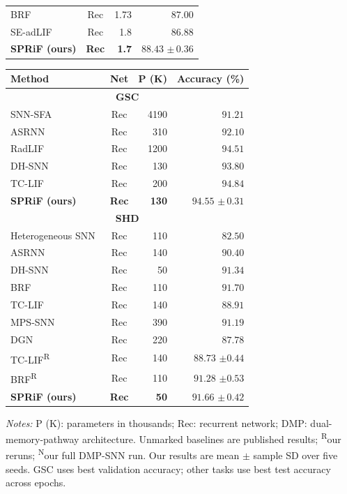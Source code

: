 \documentclass[letterpaper,journal]{IEEEtran}
\begin{document}
\begin{table}[!t]
\begin{minipage}[t]{0.49\textwidth}
\begin{tabular*}{\linewidth}{@{\extracolsep{\fill}}lcrr@{}}
BRF~\cite{brf} & Rec & 1.73 & $87.00$\\
SE-adLIF~\cite{adlif} & Rec & 1.8 & $86.88$\\
\textbf{SPRiF (ours)} & \textbf{Rec} & \textbf{1.7} & $\mathbf{88.43}$ $\boldsymbol{\pm}\,\mathbf{0.36}$\\
\bottomrule
\end{tabular*}
\end{minipage}
\hfill
\begin{minipage}[t]{0.49\textwidth}
\vspace{0pt}
\centering\footnotesize
\setlength{\tabcolsep}{2pt}
\renewcommand{\arraystretch}{0.90}
\begin{tabular*}{\linewidth}{@{\extracolsep{\fill}}lcrr@{}}
\toprule
Method & Net & P (K) & Accuracy (\%)\\
\midrule
\multicolumn{4}{c}{\textbf{GSC}}\\
\midrule
SNN-SFA~\cite{snnsfa} & Rec & 4190 & $91.21$\\
ASRNN~\cite{asrnn} & Rec & 310 & $92.10$\\
RadLIF~\cite{radlif} & Rec & 1200 & $94.51$\\
DH-SNN~\cite{dhsnn} & Rec & 130 & $93.80$\\
TC-LIF~\cite{tclif} & Rec & 200 & $94.84$\\
\textbf{SPRiF (ours)} & \textbf{Rec} & \textbf{130} & $\mathbf{94.55}$ $\boldsymbol{\pm}\,\mathbf{0.31}$\\
\midrule
\multicolumn{4}{c}{\textbf{SHD}}\\
\midrule
Heterogeneous SNN~\cite{heterogeneity} & Rec & 110 & $82.50$\\
ASRNN~\cite{asrnn} & Rec & 140 & $90.40$\\
DH-SNN~\cite{dhsnn} & Rec & 50 & $91.34$\\
BRF~\cite{brf} & Rec & 110 & $91.70$\\
TC-LIF~\cite{tclif} & Rec & 140 & $88.91$\\
MPS-SNN~\cite{mpssnn} & Rec & 390 & $91.19$\\
DGN~\cite{dgn} & Rec & 220 & $87.78$\\
TC-LIF\textsuperscript{R}~\cite{tclif} & Rec & 140 & $88.73$ $\pm 0.44$\\
BRF\textsuperscript{R}~\cite{brf} & Rec & 110 & $91.28$ $\pm 0.53$\\
\textbf{SPRiF (ours)} & \textbf{Rec} & \textbf{50} & $\mathbf{91.66}$ $\boldsymbol{\pm}\,\mathbf{0.42}$\\
\bottomrule
\end{tabular*}
\par\vspace{4pt}\raggedright
\textit{Notes:} P (K): parameters in thousands; Rec: recurrent network; DMP: dual-memory-pathway architecture. Unmarked baselines are published results; \textsuperscript{R}our reruns; \textsuperscript{N}our full DMP-SNN run. Our results are mean $\pm$ sample SD over five seeds. GSC uses best validation accuracy; other tasks use best test accuracy across epochs.
\end{minipage}
\end{table}
\end{document}
